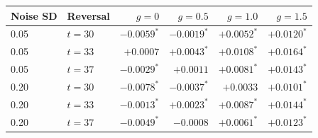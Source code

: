\begin{tabular}{llrrrr}
\toprule
Noise SD & Reversal & $g=0$ & $g=0.5$ & $g=1.0$ & $g=1.5$ \\
\midrule
0.05 & $t=30$ & $-0.0059^{*}$ & $-0.0019^{*}$ & $+0.0052^{*}$ & $+0.0120^{*}$ \\
0.05 & $t=33$ & $+0.0007$ & $+0.0043^{*}$ & $+0.0108^{*}$ & $+0.0164^{*}$ \\
0.05 & $t=37$ & $-0.0029^{*}$ & $+0.0011$ & $+0.0081^{*}$ & $+0.0143^{*}$ \\
0.20 & $t=30$ & $-0.0078^{*}$ & $-0.0037^{*}$ & $+0.0033$ & $+0.0101^{*}$ \\
0.20 & $t=33$ & $-0.0013^{*}$ & $+0.0023^{*}$ & $+0.0087^{*}$ & $+0.0144^{*}$ \\
0.20 & $t=37$ & $-0.0049^{*}$ & $-0.0008$ & $+0.0061^{*}$ & $+0.0123^{*}$ \\
\bottomrule
\end{tabular}

